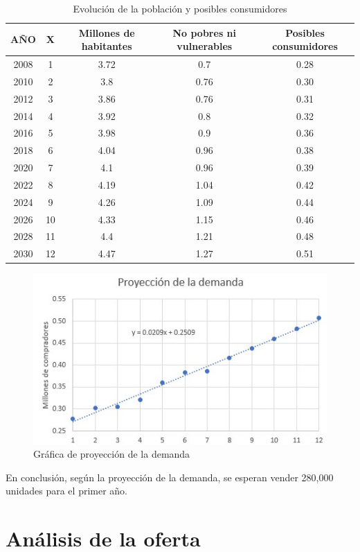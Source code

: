 \begin{table}[h!]
\centering
\begin{tabular}{|c|c|c|c|c|}
\hline
\textbf{AÑO} & \textbf{X} & \textbf{Millones de habitantes} & \textbf{No pobres ni vulnerables} & \textbf{Posibles consumidores} \\
\hline
2008 & 1 & 3.72 & 0.7 & 0.28 \\
2010 & 2 & 3.8 & 0.76 & 0.30 \\
2012 & 3 & 3.86 & 0.76 & 0.31 \\
2014 & 4 & 3.92 & 0.8 & 0.32 \\
2016 & 5 & 3.98 & 0.9 & 0.36 \\
2018 & 6 & 4.04 & 0.96 & 0.38 \\
2020 & 7 & 4.1 & 0.96 & 0.39 \\
2022 & 8 & 4.19 & 1.04 & 0.42 \\
2024 & 9 & 4.26 & 1.09 & 0.44 \\
2026 & 10 & 4.33 & 1.15 & 0.46 \\
2028 & 11 & 4.4 & 1.21 & 0.48 \\
2030 & 12 & 4.47 & 1.27 & 0.51 \\
\hline
\end{tabular}
\caption{Evolución de la población y posibles consumidores}
\label{tab:my_label}
\end{table}


\begin{figure}[H]
    \centering	
    \includegraphics[width=.8\textwidth]{img/Empresa/ProyeccionDemanda.jpg} 
    \caption{Gráfica de proyección de la demanda}
\label{fig:GraficaProyeccionDemanda}
\end{figure}

En conclusión, según la proyección de la demanda, se esperan vender 280,000 unidades para el primer año.

\section{Análisis de la oferta }

